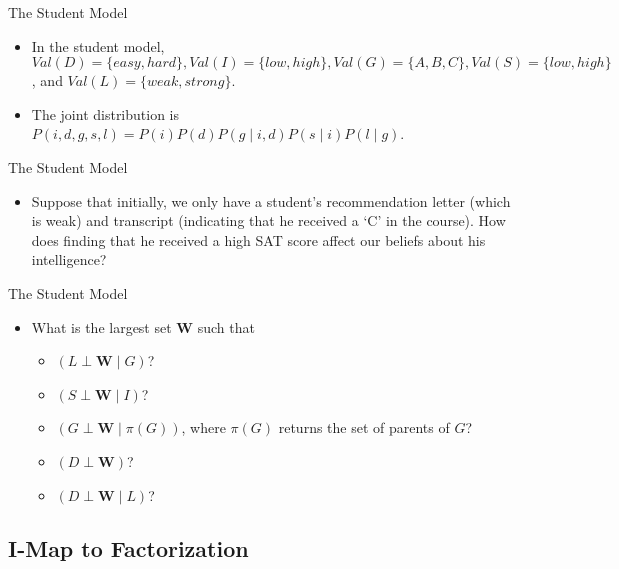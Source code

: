 \documentclass[11pt]{beamer}
\begin{document}
\begin{frame}{The Student Model}
\vspace{0pt}
\centering
\resizebox{0.8\textwidth}{!}{\studentmodel}
\begin{itemize}
	\item In the student model, $Val(D) = \{easy,hard\}, Val(I) =
	\{low,high\}, Val(G) = \{A,B,C\}, Val(S) = \{low,high\}$, and $Val(L) =
	\{weak,strong\}$.
	\item The joint distribution is $P(i,d,g,s,l) =
	P(i)P(d)P(g\;|\;i,d)P(s\;|\;i)P(l\;|\;g)$.
\end{itemize}
\end{frame}

\begin{frame}{The Student Model}
\vspace{0pt}
\centering
\resizebox{0.8\textwidth}{!}{\studentmodel}
\begin{itemize}
	\item Suppose that initially, we only have a student's recommendation
	letter (which is weak) and transcript (indicating that he received a `C'
	in the course). How does finding that he received a high SAT score
	affect our beliefs about his intelligence?
\end{itemize}
\end{frame}

\begin{frame}{The Student Model}
\vspace{0pt}
\centering
\resizebox{0.8\textwidth}{!}{\studentmodel}
\begin{itemize}
	\item What is the largest set $\boldsymbol{W}$ such that
	\begin{itemize}
		\item $(L \perp	\boldsymbol{W} \;|\; G)$?
		\item $(S \perp \boldsymbol{W} \;|\; I)$?
		\item $(G \perp \boldsymbol{W} \;|\; \pi(G))$, where $\pi(G)$
		returns the set of parents of $G$?
		\item $(D \perp \boldsymbol{W})$?
		\item $(D \perp \boldsymbol{W} \;|\; L)$?
	\end{itemize}
\end{itemize}
\end{frame}

\subsection{I-Map to Factorization}
\end{document}
